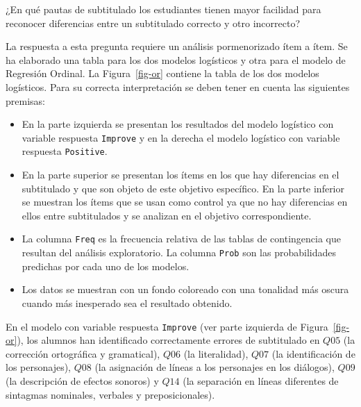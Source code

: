 \documentclass[
  12pt,
  a4paper,
  extrafontsizes,
  onecolumn,
  openright,
  table]{memoir}
\providecommand{\tightlist}{%
  \setlength{\itemsep}{0pt}\setlength{\parskip}{0pt}}\usepackage{longtable,booktabs,array}
\begin{document}
\begin{tcolorbox}[enhanced jigsaw, rightrule=.15mm, colback=white, toptitle=1mm, colbacktitle=quarto-callout-tip-color!10!white, toprule=.15mm, titlerule=0mm, bottomtitle=1mm, opacitybacktitle=0.6, colframe=quarto-callout-tip-color-frame, coltitle=black, leftrule=.75mm, bottomrule=.15mm, title=\textcolor{quarto-callout-tip-color}{\faLightbulb}\hspace{0.5em}{Objetivo específico}, arc=.35mm, breakable, opacityback=0, left=2mm]

¿En qué pautas de subtitulado los estudiantes tienen mayor facilidad
para reconocer diferencias entre un subtitulado correcto y otro
incorrecto?

\end{tcolorbox}

La respuesta a esta pregunta requiere un análisis pormenorizado ítem a
ítem. Se ha elaborado una tabla para los dos modelos logísticos y otra
para el modelo de Regresión Ordinal. La Figura~\ref{fig-or} contiene la
tabla de los dos modelos logísticos. Para su correcta interpretación se
deben tener en cuenta las siguientes premisas:

\begin{itemize}
\tightlist
\item
  En la parte izquierda se presentan los resultados del modelo logístico
  con variable respuesta \texttt{Improve} y en la derecha el modelo
  logístico con variable respuesta \texttt{Positive}.
\item
  En la parte superior se presentan los ítems en los que hay diferencias
  en el subtitulado y que son objeto de este objetivo específico. En la
  parte inferior se muestran los ítems que se usan como control ya que
  no hay diferencias en ellos entre subtitulados y se analizan en el
  objetivo correspondiente.
\item
  La columna \texttt{Freq} es la frecuencia relativa de las tablas de
  contingencia que resultan del análisis exploratorio. La columna
  \texttt{Prob} son las probabilidades predichas por cada uno de los
  modelos.
\item
  Los datos se muestran con un fondo coloreado con una tonalidad más
  oscura cuando más inesperado sea el resultado obtenido.
\end{itemize}

En el modelo con variable respuesta \texttt{Improve} (ver parte
izquierda de Figura~\ref{fig-or}), los alumnos han identificado
correctamente errores de subtitulado en \(Q05\) (la corrección
ortográfica y gramatical), \(Q06\) (la literalidad), \(Q07\) (la
identificación de los personajes), \(Q08\) (la asignación de líneas a
los personajes en los diálogos), \(Q09\) (la descripción de efectos
sonoros) y \(Q14\) (la separación en líneas diferentes de sintagmas
nominales, verbales y preposicionales).
\end{document}
